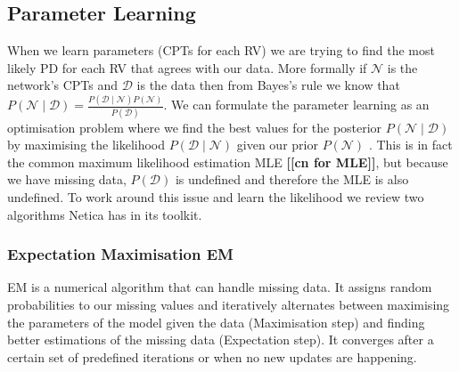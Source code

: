 \documentclass{UoYCSproject}
\begin{document}
\subsection{Parameter Learning}
\label{subsec:param_learning}
When we learn parameters (CPTs for each RV) we are trying to find the most likely PD for each RV that agrees with our data. More formally if \(\mathcal{N}\) is the network's CPTs and \(\mathcal{D}\) is the data then from Bayes's rule we know that \(P(\mathcal{N} \mid \mathcal{D}) = \frac{P(\mathcal{D} \mid \mathcal{N})P(\mathcal{N})}{P(\mathcal{D})}\). We can formulate the parameter learning as an optimisation problem where we find the best values for the posterior \(P(\mathcal{N} \mid \mathcal{D})\) by maximising the likelihood \(P(\mathcal{D} \mid \mathcal{N})\) given our prior \(P(\mathcal{N})\) \parencite[46-48]{neticaCman}. This is in fact the common maximum likelihood estimation MLE \textbf{[[cn for MLE]]}, but because we have missing data, \(P(\mathcal{D})\) is undefined and therefore the MLE is also undefined. To work around this issue and learn the likelihood we review two algorithms Netica has in its toolkit.
 

\subsubsection{Expectation Maximisation EM}
EM \parencite{EMAlgorithm} is a numerical algorithm that can handle missing data. It assigns random probabilities to our missing values and iteratively alternates between maximising the parameters of the model given the data (Maximisation step) and finding better estimations of the missing data (Expectation step). It converges after a certain set of predefined iterations or when no new updates are happening. 
\end{document}
